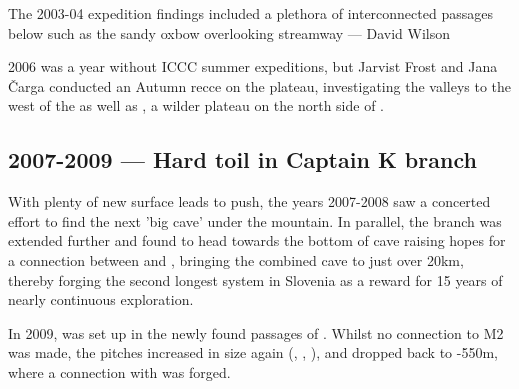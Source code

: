     
\begin{marginfigure}
	\checkoddpage \ifoddpage \forcerectofloat \else \forceversofloat \fi
	\centering	{} 
  	\caption{The 2003-04 expedition findings included a plethora of interconnected passages below \protect{} such as the sandy oxbow overlooking \protect{} streamway --- David Wilson}
	\end{marginfigure}

2006 was a year without ICCC summer expeditions, but Jarvist Frost and Jana \v{C}arga conducted an Autumn recce on the plateau, investigating the valleys to the west of the  as well as , a wilder plateau on the north side of .

\subsection{2007-2009 --- Hard toil in Captain K branch} With plenty of new surface leads to push, the years 2007-2008 saw a concerted effort to find the next 'big cave' under the mountain. In parallel, the  branch was extended further and found to head towards the bottom of  cave raising hopes for a connection between and , bringing the combined cave to just over 20km, thereby forging the second longest system in Slovenia as a reward for 15 years of nearly continuous exploration.

In 2009,  was set up in the newly found passages of . Whilst no connection to M2 was made, the pitches increased in size again (, , ), and dropped back to -550m, where a connection with  was forged. 

